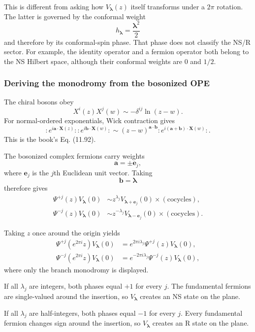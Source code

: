 \documentclass[
  10pt,
  a4paper,
  openany]{book}
\begin{document}
This is different from asking how \(V_{\boldsymbol\lambda}(z)\) itself
transforms under a \(2\pi\) rotation. The latter is governed by the
conformal weight \[
h_{\boldsymbol\lambda}
=\frac{\boldsymbol\lambda^2}{2}
\] and therefore by its conformal-spin phase. That phase does not
classify the NS/R sector. For example, the identity operator and a
fermion operator both belong to the NS Hilbert space, although their
conformal weights are \(0\) and \(1/2\).

\subsubsection{Deriving the monodromy from the bosonized
OPE}\label{deriving-the-monodromy-from-the-bosonized-ope}

The chiral bosons obey \[
X^i(z)X^j(w)
\sim
-\delta^{ij}\ln(z-w).
\] For normal-ordered exponentials, Wick contraction gives \[
:\!e^{i\mathbf a\cdot\mathbf X(z)}\!:
:\!e^{i\mathbf b\cdot\mathbf X(w)}\!:
\sim
(z-w)^{\mathbf a\cdot\mathbf b}
:\!e^{i(\mathbf a+\mathbf b)\cdot\mathbf X(w)}\!:.
\] This is the book's Eq. (11.92).

The bosonized complex fermions carry weights \[
\mathbf a=\pm\mathbf e_j,
\] where \(\mathbf e_j\) is the \(j\)th Euclidean unit vector. Taking \[
\mathbf b=\boldsymbol\lambda
\] therefore gives \[
\begin{aligned}
\Psi^{+j}(z)V_{\boldsymbol\lambda}(0)
&\sim
z^{\lambda_j}
V_{\boldsymbol\lambda+\mathbf e_j}(0)
\times(\text{cocycles}),\\%
\Psi^{-j}(z)V_{\boldsymbol\lambda}(0)
&\sim
z^{-\lambda_j}
V_{\boldsymbol\lambda-\mathbf e_j}(0)
\times(\text{cocycles}).
\end{aligned}
\]

Taking \(z\) once around the origin yields \[
\begin{aligned}
\Psi^{+j}(e^{2\pi i}z)V_{\boldsymbol\lambda}(0)
&=
e^{2\pi i\lambda_j}
\Psi^{+j}(z)V_{\boldsymbol\lambda}(0),\\%
\Psi^{-j}(e^{2\pi i}z)V_{\boldsymbol\lambda}(0)
&=
e^{-2\pi i\lambda_j}
\Psi^{-j}(z)V_{\boldsymbol\lambda}(0),
\end{aligned}
\] where only the branch monodromy is displayed.

If all \(\lambda_j\) are integers, both phases equal \(+1\) for every
\(j\). The fundamental fermions are single-valued around the insertion,
so \(V_{\boldsymbol\lambda}\) creates an NS state on the plane.

If all \(\lambda_j\) are half-integers, both phases equal \(-1\) for
every \(j\). Every fundamental fermion changes sign around the
insertion, so \(V_{\boldsymbol\lambda}\) creates an R state on the
plane.
\end{document}
